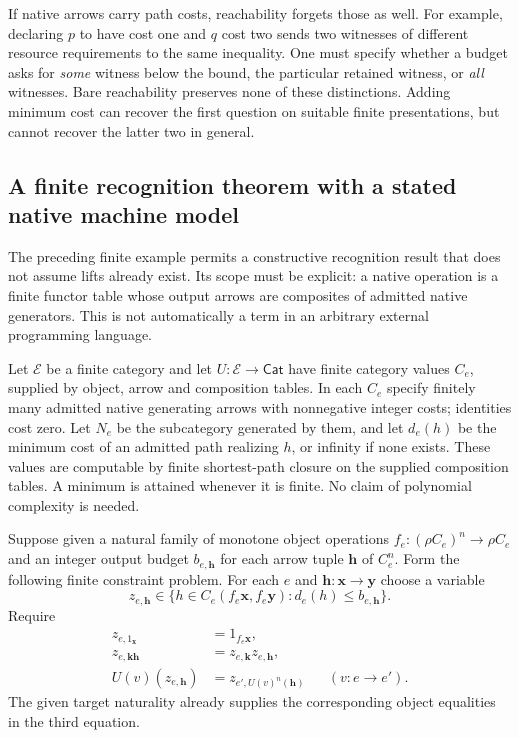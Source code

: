 \documentclass[11pt]{article}
\theoremstyle{definition}
\theoremstyle{remark}
\begin{document}
If native arrows carry path costs, reachability forgets those as well.
For example, declaring $p$ to have cost one and $q$ cost two sends two
witnesses of different resource requirements to the same inequality.
One must specify whether a budget asks for \emph{some} witness below the
bound, the particular retained witness, or \emph{all} witnesses. Bare
reachability preserves none of these distinctions. Adding minimum cost
can recover the first question on suitable finite presentations, but
cannot recover the latter two in general.

\subsection{A finite recognition theorem with a stated native machine model}
\label{subsec:dc-finite-recognition}
The preceding finite example permits a constructive recognition result
that does not assume lifts already exist. Its scope must be explicit:
a native operation is a finite functor table whose output arrows are
composites of admitted native generators. This is not automatically a
term in an arbitrary external programming language.

Let $\mathcal E$ be a finite category and let
$U:\mathcal E\to\mathsf{Cat}$ have finite category values $C_e$, supplied
by object, arrow and composition tables. In each $C_e$ specify finitely
many admitted native generating arrows with nonnegative integer costs;
identities cost zero. Let $N_e$ be the subcategory generated by them,
and let $d_e(h)$ be the minimum cost of an admitted path realizing $h$,
or infinity if none exists. These values are computable by finite
shortest-path closure on the supplied composition tables. A minimum is
attained whenever it is finite. No claim of polynomial complexity is
needed.

Suppose given a natural family of monotone object operations
$f_e:(\rho C_e)^n\to \rho C_e$ and an integer output budget $b_{e,\mathbf h}$
for each arrow tuple $\mathbf h$ of $C_e^n$. Form the following finite
constraint problem. For each $e$ and $\mathbf h:\mathbf x\to\mathbf y$
choose a variable
\[
 z_{e,\mathbf h}\in
 \{h\in C_e(f_e\mathbf x,f_e\mathbf y):
                  d_e(h)\leq b_{e,\mathbf h}\}.
\]
Require
\begin{align*}
 z_{e,1_{\mathbf x}}&=1_{f_e\mathbf x},\\
 z_{e,\mathbf k\mathbf h}&=z_{e,\mathbf k}z_{e,\mathbf h},\\
 U(v)(z_{e,\mathbf h})&=z_{e',U(v)^n(\mathbf h)}
       &&(v:e\to e').
\end{align*}
The given target naturality already supplies the corresponding object
equalities in the third equation.
\end{document}
